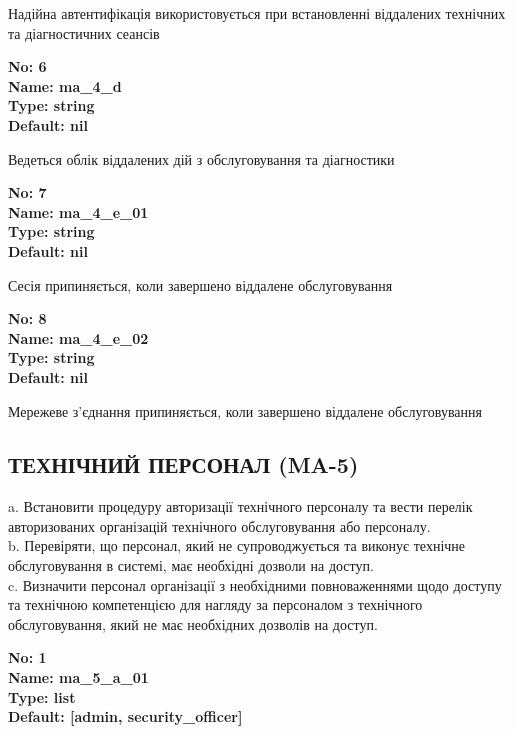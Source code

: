 \documentclass{article}
\begin{document}
{\footnotesize Надійна автентифікація використовується при встановленні віддалених технічних та діагностичних сеансів}


{\footnotesize\bfseries
No: 6\\
Name: ma\_\allowbreak{}4\_\allowbreak{}d\\
Type: string\\
Default: nil
}

{\footnotesize Ведеться облік віддалених дій з обслуговування та діагностики}


{\footnotesize\bfseries
No: 7\\
Name: ma\_\allowbreak{}4\_\allowbreak{}e\_\allowbreak{}01\\
Type: string\\
Default: nil
}

{\footnotesize Сесія припиняється, коли завершено віддалене обслуговування}


{\footnotesize\bfseries
No: 8\\
Name: ma\_\allowbreak{}4\_\allowbreak{}e\_\allowbreak{}02\\
Type: string\\
Default: nil
}

{\footnotesize Мережеве з'єднання припиняється, коли завершено віддалене обслуговування}




\subsection{ТЕХНІЧНИЙ ПЕРСОНАЛ (MA-5)}
a. Встановити процедуру авторизації технічного персоналу та вести перелік авторизованих організацій технічного обслуговування або персоналу.\\ 
b. Перевіряти, що персонал, який не супроводжується та виконує технічне обслуговування в системі, має необхідні дозволи на доступ.\\ 
c. Визначити персонал організації з необхідними повноваженнями щодо доступу та технічною компетенцією для нагляду за персоналом з технічного обслуговування, який не має необхідних дозволів на доступ.

\vspace{10pt}
{\footnotesize\bfseries
No: 1\\
Name: ma\_\allowbreak{}5\_\allowbreak{}a\_\allowbreak{}01\\
Type: list\\
Default: [\textquotedbl{}admin\textquotedbl{}, \textquotedbl{}security\_\allowbreak{}officer\textquotedbl{}]
}
\end{document}
